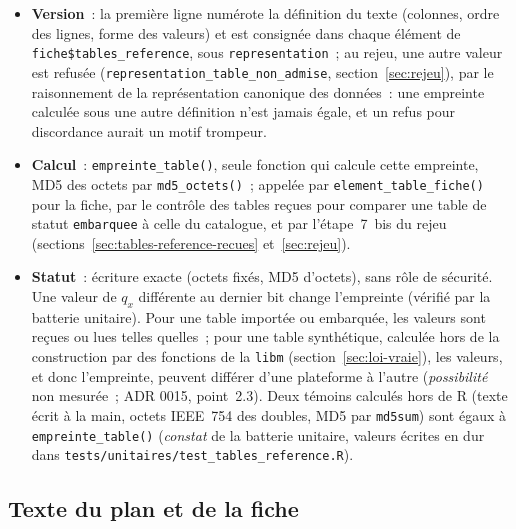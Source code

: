 \documentclass[a4paper,11pt]{article}
\newcommand{\code}[1]{\texttt{\small #1}}
\begin{document}
\begin{itemize}[leftmargin=*, itemsep=2pt]
    \code{parametres}) \textbf{n'y entrent pas}~: elles sont écrites en clair
    dans la fiche, à côté de l'empreinte (section~\ref{sec:fiche}, «~Tables
    de référence~»).
  \item \textbf{Version}~: la première ligne numérote la définition du texte
    (colonnes, ordre des lignes, forme des valeurs) et est consignée dans
    chaque élément de \code{fiche\$tables\_reference}, sous
    \code{representation}~; au rejeu, une autre valeur est refusée
    (\code{representation\_table\_non\_admise}, section~\ref{sec:rejeu}),
    par le raisonnement de la représentation canonique des données~: une
    empreinte calculée sous une autre définition n'est jamais égale, et un
    refus pour discordance aurait un motif trompeur.
  \item \textbf{Calcul}~: \code{empreinte\_table()}, seule fonction qui
    calcule cette empreinte, MD5 des octets par \code{md5\_octets()}~;
    appelée par \code{element\_table\_fiche()} pour la fiche, par le
    contrôle des tables reçues pour comparer une table de statut
    \code{embarquee} à celle du catalogue, et par l'étape~7~bis du rejeu
    (sections~\ref{sec:tables-reference-recues} et~\ref{sec:rejeu}).
  \item \textbf{Statut}~: écriture exacte (octets fixés, MD5 d'octets),
    sans rôle de sécurité. Une valeur de $q_x$ différente au dernier bit
    change l'empreinte (vérifié par la batterie unitaire). Pour une table
    importée ou embarquée, les valeurs sont reçues ou lues telles quelles~;
    pour une table synthétique, calculée hors de la construction par des
    fonctions de la \code{libm} (section~\ref{sec:loi-vraie}), les valeurs,
    et donc l'empreinte, peuvent différer d'une plateforme à l'autre
    (\emph{possibilité} non mesurée~; ADR 0015, point~2.3). Deux témoins
    calculés hors de R (texte écrit à la main, octets IEEE~754 des doubles,
    MD5 par \code{md5sum}) sont égaux à \code{empreinte\_table()}
    (\emph{constat} de la batterie unitaire, valeurs écrites en dur dans
    \code{tests/unitaires/test\_tables\_reference.R}).
\end{itemize}

\subsection{Texte du plan et de la fiche}
\label{sec:serialisation}
\end{document}
